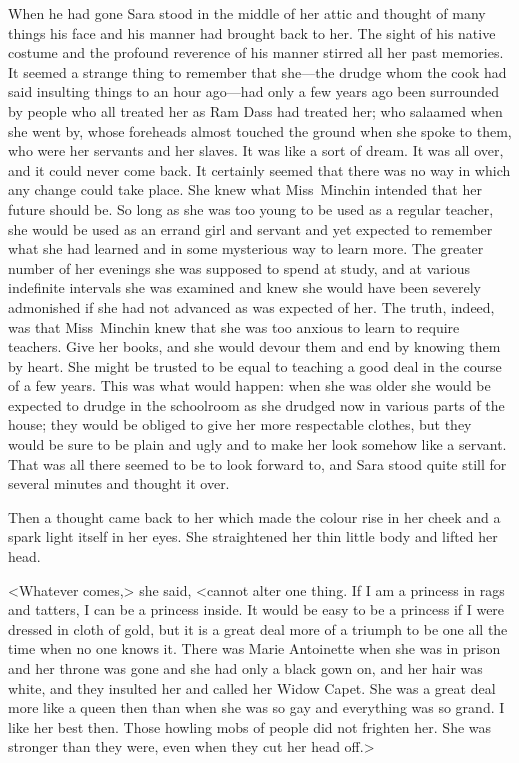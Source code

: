 When he had gone Sara stood in the middle of her attic and thought of many things his face and his manner had brought back to her. The sight of his native costume and the profound reverence of his manner stirred all her past memories. It seemed a strange thing to remember that she—the drudge whom the cook had said insulting things to an hour ago—had only a few years ago been surrounded by people who all treated her as Ram Dass had treated her; who salaamed when she went by, whose foreheads almost touched the ground when she spoke to them, who were her servants and her slaves. It was like a sort of dream. It was all over, and it could never come back. It certainly seemed that there was no way in which any change could take place. She knew what Miss~Minchin intended that her future should be. So long as she was too young to be used as a regular teacher, she would be used as an errand girl and servant and yet expected to remember what she had learned and in some mysterious way to learn more. The greater number of her evenings she was supposed to spend at study, and at various indefinite intervals she was examined and knew she would have been severely admonished if she had not advanced as was expected of her. The truth, indeed, was that Miss~Minchin knew that she was too anxious to learn to require teachers. Give her books, and she would devour them and end by knowing them by heart. She might be trusted to be equal to teaching a good deal in the course of a few years. This was what would happen: when she was older she would be expected to drudge in the schoolroom as she drudged now in various parts of the house; they would be obliged to give her more respectable clothes, but they would be sure to be plain and ugly and to make her look somehow like a servant. That was all there seemed to be to look forward to, and Sara stood quite still for several minutes and thought it over.

Then a thought came back to her which made the colour rise in her cheek and a spark light itself in her eyes. She straightened her thin little body and lifted her head.

<Whatever comes,> she said, <cannot alter one thing. If I am a princess in rags and tatters, I can be a princess inside. It would be easy to be a princess if I were dressed in cloth of gold, but it is a great deal more of a triumph to be one all the time when no one knows it. There was Marie Antoinette when she was in prison and her throne was gone and she had only a black gown on, and her hair was white, and they insulted her and called her Widow Capet. She was a great deal more like a queen then than when she was so gay and everything was so grand. I like her best then. Those howling mobs of people did not frighten her. She was stronger than they were, even when they cut her head off.>

